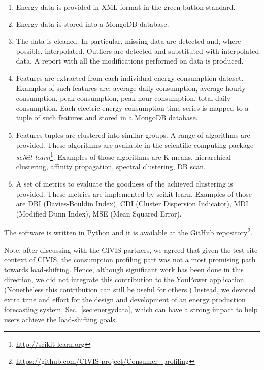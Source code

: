 \begin{enumerate} 
\item Energy data is provided in XML format in the green button standard.

\item Energy data is stored into a MongoDB database.

\item The data is cleaned. In particular, missing data are detected and, where possible, interpolated. Outliers are detected and substituted with interpolated data. A report with all the modifications performed on
data is produced. 

\item Features are extracted from each individual energy consumption dataset. Examples of such
features are: average daily consumption, average hourly consumption, peak consumption, peak hour
consumption, total daily consumption. Each electric energy consumption time series is mapped to a
tuple of such features and stored in a MongoDB database.

\item Features tuples are clustered into similar groups. A range of algorithms are provided. These
algorithms are available in the scientific computing package \textit{scikit-learn}\footnote{\url{http://scikit-learn.org}}. Examples of those algorithms are K-means,
hierarchical clustering, affinity propagation, spectral clustering, DB scan.

\item A set of metrics to evaluate the goodness of the achieved clustering is provided. These metrics are implemented by scikit-learn. Examples of those are 
DBI (Davies-Bouldin Index),
CDI  (Cluster Dispersion Indicator),
MDI (Modified Dunn Index),
MSE (Mean Squared Error).
\end{enumerate}

The software is written in Python and it is available at the GitHub repository\footnote{\url{https://github.com/CIVIS-project/Consumer_profiling}}.

Note: after discussing with the CIVIS partners, we agreed that given the test site context of CIVIS, the consumption profiling part was not a most promising path towards load-shifting. Hence, although significant work has been done in this direction, we did not integrate this contribution to the YouPower application. (Nonetheless this contribution can still be useful for others.)
Instead, we devoted extra time and effort for the design and development of an energy production forecasting
system, Sec.~\ref{sec:energydata}, which can have a strong impact to help users achieve the load-shifting goals.

